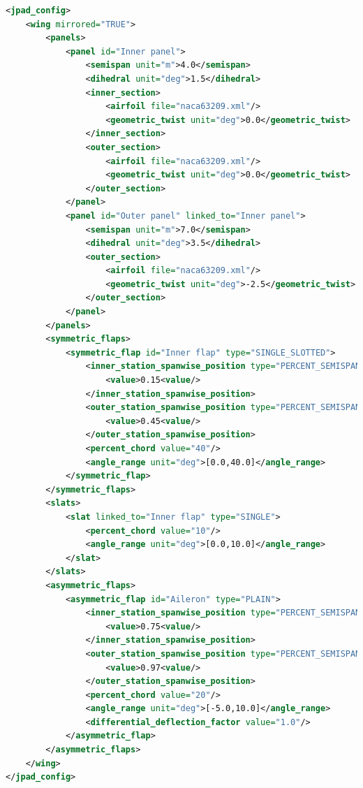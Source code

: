 \bigskip
\begin{lstlisting}[caption={Prototype of the wing XML file}, captionpos=b, tabsize=6, language=XML]
<jpad_config>
    <wing mirrored="TRUE">
        <panels>
            <panel id="Inner panel">
                <semispan unit="m">4.0</semispan>
                <dihedral unit="deg">1.5</dihedral>
                <inner_section>
                    <airfoil file="naca63209.xml"/>
                    <geometric_twist unit="deg">0.0</geometric_twist>
                </inner_section>
                <outer_section>
                    <airfoil file="naca63209.xml"/>
                    <geometric_twist unit="deg">0.0</geometric_twist>
                </outer_section>
            </panel>
            <panel id="Outer panel" linked_to="Inner panel">
                <semispan unit="m">7.0</semispan>
                <dihedral unit="deg">3.5</dihedral>
                <outer_section>
                    <airfoil file="naca63209.xml"/>
                    <geometric_twist unit="deg">-2.5</geometric_twist>
                </outer_section>
            </panel>
        </panels>
        <symmetric_flaps>
            <symmetric_flap id="Inner flap" type="SINGLE_SLOTTED">
                <inner_station_spanwise_position type="PERCENT_SEMISPAN" ref_to="FULL_SEMISPAN">
                    <value>0.15<value/>
                </inner_station_spanwise_position>
                <outer_station_spanwise_position type="PERCENT_SEMISPAN" ref_to="FULL_SEMISPAN">
                    <value>0.45<value/>
                </outer_station_spanwise_position>
                <percent_chord value="40"/>
                <angle_range unit="deg">[0.0,40.0]</angle_range>
            </symmetric_flap>
        </symmetric_flaps>
        <slats>
            <slat linked_to="Inner flap" type="SINGLE">
                <percent_chord value="10"/>
                <angle_range unit="deg">[0.0,10.0]</angle_range>
            </slat>
        </slats>
        <asymmetric_flaps>
            <asymmetric_flap id="Aileron" type="PLAIN">
                <inner_station_spanwise_position type="PERCENT_SEMISPAN" ref_to="FULL_SEMISPAN">
                    <value>0.75<value/>
                </inner_station_spanwise_position>
                <outer_station_spanwise_position type="PERCENT_SEMISPAN" ref_to="FULL_SEMISPAN">
                    <value>0.97<value/>
                </outer_station_spanwise_position>
                <percent_chord value="20"/>
                <angle_range unit="deg">[-5.0,10.0]</angle_range>
                <differential_deflection_factor value="1.0"/>
            </asymmetric_flap>
        </asymmetric_flaps>
    </wing>
</jpad_config>
\end{lstlisting}
%
